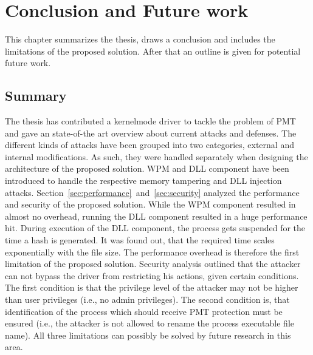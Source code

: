\section{Conclusion and Future work}
\label{sec:futurework}
This chapter summarizes the thesis, draws a conclusion and includes the limitations of the proposed solution. After that an outline is given for potential future work.
\subsection{Summary}
The thesis has contributed a kernelmode driver to tackle the problem of \gls{PMT} and gave an state-of-the art overview about current attacks and defenses. The different kinds of attacks have been grouped into two categories, external and internal modifications. As such, they were handled separately when designing the architecture of the proposed solution. \gls{WPM} and \gls{DLL} component have been introduced to handle the respective memory tampering and \gls{DLL} injection attacks. Section~\ref{sec:performance}~and~\ref{sec:security} analyzed the performance and security of the proposed solution. While the \gls{WPM} component resulted in almost no overhead, running the \gls{DLL} component resulted in a huge performance hit. During execution of the \gls{DLL} component, the process gets suspended for the time a hash is generated. It was found out, that the required time scales exponentially with the file size. The performance overhead is therefore the first limitation of the proposed solution. Security analysis outlined that the attacker can not bypass the driver from restricting his actions, given certain conditions. The first condition is that the privilege level of the attacker may not be higher than user privileges (i.e., no admin privileges). The second condition is, that identification of the process which should receive \gls{PMT} protection must be ensured (i.e., the attacker is not allowed to rename the process executable file name). All three limitations can possibly be solved by future research in this area.
